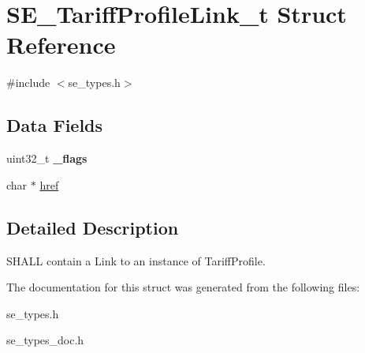 \hypertarget{structSE__TariffProfileLink__t}{}\section{S\+E\+\_\+\+Tariff\+Profile\+Link\+\_\+t Struct Reference}
\label{structSE__TariffProfileLink__t}


{\ttfamily \#include $<$se\+\_\+types.\+h$>$}

\subsection*{Data Fields}
\begin{DoxyCompactItemize}
\item 
uint32\+\_\+t {\bfseries \+\_\+flags}
\item 
char $\ast$ \hyperlink{group__TariffProfileLink_ga723f6a02e0b130273ca497c1b5b94cef}{href}
\end{DoxyCompactItemize}


\subsection{Detailed Description}
S\+H\+A\+LL contain a Link to an instance of Tariff\+Profile. 

The documentation for this struct was generated from the following files\+:\begin{DoxyCompactItemize}
\item 
se\+\_\+types.\+h\item 
se\+\_\+types\+\_\+doc.\+h\end{DoxyCompactItemize}
